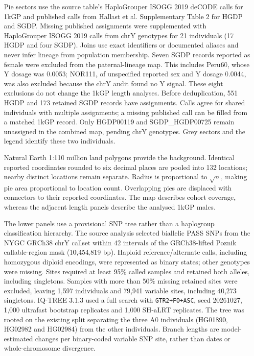 \documentclass[pdflatex,sn-nature]{sn-jnl}
\begin{document}
Pie sectors use the source table's HaploGrouper ISOGG 2019 deCODE calls for 1kGP and published calls from Hallast et al. Supplementary Table 2 \cite{Hallast2021} for HGDP and SGDP. Missing published assignments were supplemented with HaploGrouper ISOGG 2019 calls from chrY genotypes for 21 individuals (17 HGDP and four SGDP). Joins use exact identifiers or documented aliases and never infer lineage from population membership. Seven SGDP records reported as female were excluded from the paternal-lineage map. This includes Peru60, whose Y dosage was 0.0053; NOR111, of unspecified reported sex and Y dosage 0.0044, was also excluded because the chrY audit found no Y signal. These eight exclusions do not change the 1kGP length analyses. Before deduplication, 551 HGDP and 173 retained SGDP records have assignments. Calls agree for shared individuals with multiple assignments; a missing published call can be filled from a matched 1kGP record. Only HGDP00119 and SGDP\_HGDP00725 remain unassigned in the combined map, pending chrY genotypes. Grey sectors and the legend identify these two individuals.

Natural Earth 1:110 million land polygons provide the background. Identical reported coordinates rounded to six decimal places are pooled into 132 locations; nearby distinct locations remain separate. Radius is proportional to $\sqrt n$, making pie area proportional to location count. Overlapping pies are displaced with connectors to their reported coordinates. The map describes cohort coverage, whereas the adjacent length panels describe the analysed 1kGP males.

The lower panels use a provisional SNP tree rather than a haplogroup classification hierarchy. The source analysis selected biallelic PASS SNPs from the NYGC GRCh38 chrY callset within 42 intervals of the GRCh38-lifted Poznik callable-region mask (10,454,819 bp). Haploid reference/alternate calls, including homozygous diploid encodings, were represented as binary states; other genotypes were missing. Sites required at least 95\% called samples and retained both alleles, including singletons. Samples with more than 50\% missing retained sites were excluded, leaving 1,597 individuals and 79,941 variable sites, including 40,273 singletons. IQ-TREE 3.1.3 \cite{Wong2026} used a full search with \texttt{GTR2+FO+ASC}, seed 20261027, 1,000 ultrafast bootstrap replicates \cite{Hoang2018} and 1,000 SH-aLRT replicates. The tree was rooted on the existing split separating the three A0 individuals (HG01890, HG02982 and HG02984) from the other individuals. Branch lengths are model-estimated changes per binary-coded variable SNP site, rather than dates or whole-chromosome divergence.
\end{document}
